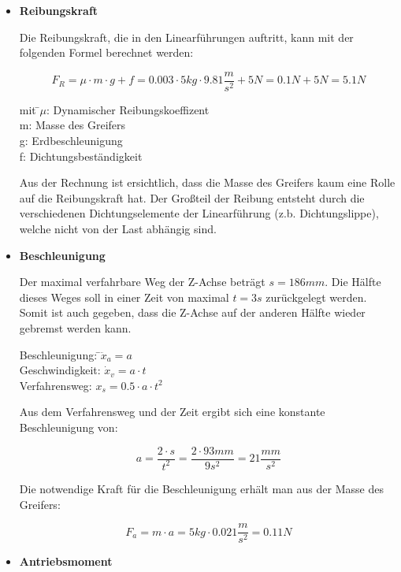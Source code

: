 \begin{itemize}

\item \textbf{Reibungskraft}

Die Reibungskraft, die in den Linearführungen auftritt, kann mit der folgenden Formel berechnet werden:

\[F_R=\mu\cdot m\cdot g+f=0.003 \cdot 5kg \cdot 9.81\dfrac{m}{s^2}+5N = 0.1N + 5N = 5.1N\]

\begin{tabbing}
mit \=$\mu$: Dynamischer Reibungskoeffizent\\
		\>m: Masse des Greifers\\
		\>g: Erdbeschleunigung\\
		\>f: Dichtungsbeständigkeit\\
\end{tabbing}

Aus der Rechnung ist ersichtlich, dass die Masse des Greifers kaum eine Rolle auf die Reibungskraft hat. 
Der Großteil der Reibung entsteht durch die verschiedenen Dichtungselemente der Linearführung (z.b. Dichtungslippe), 
welche nicht von der Last abhängig sind.


\item \textbf{Beschleunigung}
 
Der maximal verfahrbare Weg der Z-Achse beträgt $s=186mm$. Die Hälfte dieses Weges soll in einer Zeit von maximal $t=3s$ zurückgelegt werden. Somit ist auch gegeben, dass die Z-Achse auf der anderen Hälfte wieder gebremst werden kann. 


\begin{tabbing}
Beschleunigung: \qquad \=$\ddot{x}_a=a$\\
Geschwindigkeit: 							\>$\dot{x}_v=a\cdot t$\\
Verfahrensweg:												\>$x_s=0.5\cdot a\cdot t^2$\\
\end{tabbing}

Aus dem Verfahrensweg und der Zeit ergibt sich eine konstante Beschleunigung von:

\[a=\dfrac{2\cdot s}{t^2}=\dfrac{2\cdot 93mm}{9s^2}= 21\dfrac{mm}{s^2}\]

Die notwendige Kraft für die Beschleunigung erhält man aus der Masse des Greifers:

\[F_a=m\cdot a=5kg \cdot 0.021\dfrac{m}{s^2}=0.11N\]

\item \textbf{Antriebsmoment}



\end{itemize}
